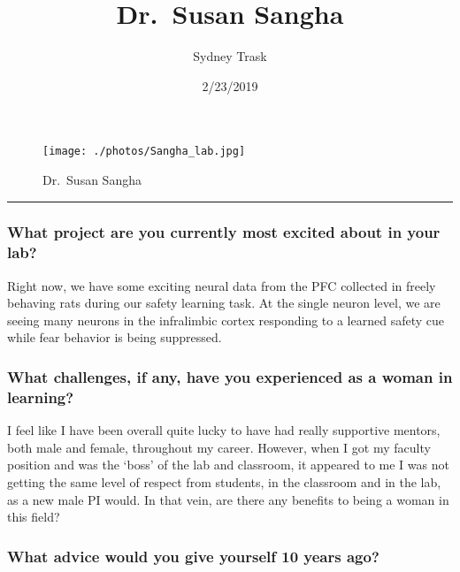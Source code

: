 \documentclass[]{article}
\title{Dr.~Susan Sangha}
\author{Sydney Trask}
\date{2/23/2019}
\begin{document}
\maketitle

\begin{figure}
\centering
\texttt{[image: ./photos/Sangha\_lab.jpg]}
\caption{Dr.~Susan Sangha}
\end{figure}

\begin{center}\rule{0.5\linewidth}{\linethickness}\end{center}

\subsubsection{\texorpdfstring{\textbf{What project are you currently
most excited about in your
lab?}}{What project are you currently most excited about in your lab?}}\label{what-project-are-you-currently-most-excited-about-in-your-lab}

Right now, we have some exciting neural data from the PFC collected in
freely behaving rats during our safety learning task. At the single
neuron level, we are seeing many neurons in the infralimbic cortex
responding to a learned safety cue while fear behavior is being
suppressed.

\subsubsection{\texorpdfstring{\textbf{What challenges, if any, have you
experienced as a woman in
learning?}}{What challenges, if any, have you experienced as a woman in learning?}}\label{what-challenges-if-any-have-you-experienced-as-a-woman-in-learning}

I feel like I have been overall quite lucky to have had really
supportive mentors, both male and female, throughout my career. However,
when I got my faculty position and was the `boss' of the lab and
classroom, it appeared to me I was not getting the same level of respect
from students, in the classroom and in the lab, as a new male PI would.
In that vein, are there any benefits to being a woman in this field?

\subsubsection{\texorpdfstring{\textbf{What advice would you give
yourself 10 years
ago?}}{What advice would you give yourself 10 years ago?}}\label{what-advice-would-you-give-yourself-10-years-ago}
\end{document}
